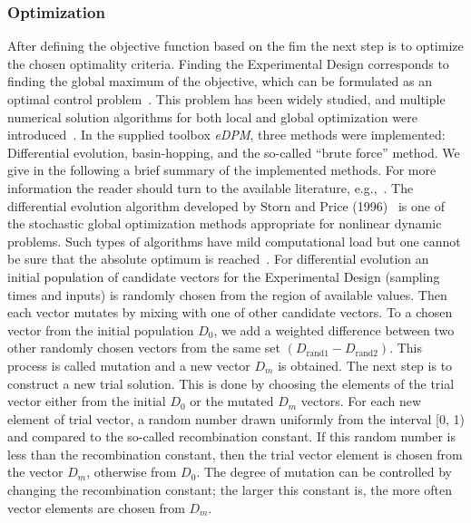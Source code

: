 \documentclass[10pt,A4paper]{article}
\begin{document}
\subsubsection*{Optimization}
After defining the objective function based on the \ac{fim} the next step is to optimize the chosen optimality criteria.
Finding the Experimental Design corresponds to finding the global maximum of the objective, which can be formulated as an optimal control problem~\cite{espie_optimal_1989}.
This problem has been widely studied, and multiple numerical solution algorithms for both local and global optimization were introduced~\cite{esposito_global_2000, bangaImprovingFoodProcessing2003, ali_numerical_1997, runarsson_stochastic_2000}.
In the supplied toolbox {\it eDPM}, three methods were implemented: Differential evolution, basin-hopping, and the so-called “brute force” method.
We give in the following a brief summary of the implemented methods.
For more information the reader should turn to the available literature, e.g.,~\cite{stornDifferentialEvolutionSimple1997, wales_global_1997}.
\newline
%
The differential evolution algorithm developed by Storn and Price (1996)~\cite{stornDifferentialEvolutionSimple1997} is one of the stochastic global optimization methods appropriate for nonlinear dynamic problems.
Such types of algorithms have mild computational load but one cannot be sure that the absolute optimum is reached~\cite{balsa-cantoe.bangaj.r.COMPUTINGOPTIMALDYNAMIC2008}.
For differential evolution an initial population of candidate vectors for the Experimental Design (sampling times and inputs) is randomly chosen from the region of available values.
Then each vector mutates by mixing with one of other candidate vectors.
To a chosen vector from the initial population $D_0$, we add a weighted difference between two other randomly chosen vectors from the same set $(D_\text{rand1} - D_\text{rand2})$.
This process is called mutation and a new vector $D_m$ is obtained.
The next step is to construct a new trial solution.
This is done by choosing the elements of the trial vector either from the initial $D_0$ or the mutated $D_m$ vectors.
For each new element of trial vector, a random number drawn uniformly from the interval [0, 1) and compared to the so-called recombination constant.
If this random number is less than the recombination constant, then the trial vector element is chosen from the vector $D_m$, otherwise from $D_0$.
The degree of mutation can be controlled by changing the recombination constant; the larger this constant is, the more often vector elements are chosen from $D_m$.
\end{document}
